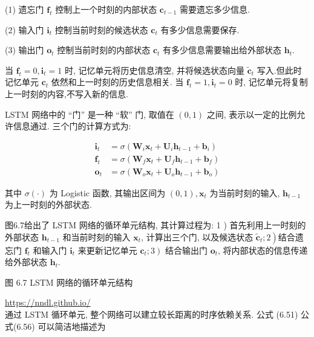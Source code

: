 \documentclass[10pt]{article}
\begin{document}
(1) 遗忘门 $\boldsymbol{f}_{t}$ 控制上一个时刻的内部状态 $\boldsymbol{c}_{t-1}$ 需要遗忘多少信息.

(2) 输入门 $\boldsymbol{i}_{t}$ 控制当前时刻的候选状态 $\boldsymbol{c}_{t}$ 有多少信息需要保存.

(3) 输出门 $\boldsymbol{o}_{t}$ 控制当前时刻的内部状态 $\boldsymbol{c}_{t}$ 有多少信息需要输出给外部状态 $\boldsymbol{h}_{t}$.

当 $\boldsymbol{f}_{t}=0, \boldsymbol{i}_{t}=1$ 时, 记忆单元将历史信息清空, 并将候选状态向量 $\tilde{\boldsymbol{c}}_{t}$ 写入.但此时记忆单元 $\boldsymbol{c}_{t}$ 依然和上一时刻的历史信息相关. 当 $\boldsymbol{f}_{t}=1, \boldsymbol{i}_{t}=0$ 时, 记忆单元将复制上一时刻的内容,不写入新的信息.

LSTM 网络中的 “门” 是一种 “软” 门, 取值在 $(0,1)$ 之间, 表示以一定的比例允许信息通过. 三个门的计算方式为:


\begin{align*}
\boldsymbol{i}_{t} & =\sigma\left(\boldsymbol{W}_{i} \boldsymbol{x}_{t}+\boldsymbol{U}_{i} \boldsymbol{h}_{t-1}+\boldsymbol{b}_{i}\right)  \tag{6.54}\\
\boldsymbol{f}_{t} & =\sigma\left(\boldsymbol{W}_{f} \boldsymbol{x}_{t}+\boldsymbol{U}_{f} \boldsymbol{h}_{t-1}+\boldsymbol{b}_{f}\right)  \tag{6.55}\\
\boldsymbol{o}_{t} & =\sigma\left(\boldsymbol{W}_{o} \boldsymbol{x}_{t}+\boldsymbol{U}_{o} \boldsymbol{h}_{t-1}+\boldsymbol{b}_{o}\right) \tag{6.56}
\end{align*}


其中 $\sigma(\cdot)$ 为 Logistic 函数, 其输出区间为 $(0,1), \boldsymbol{x}_{t}$ 为当前时刻的输入, $\boldsymbol{h}_{t-1}$ 为上一时刻的外部状态.

图6.7给出了 LSTM 网络的循环单元结构, 其计算过程为: 1 ) 首先利用上一时刻的外部状态 $\boldsymbol{h}_{t-1}$ 和当前时刻的输入 $\boldsymbol{x}_{t}$, 计算出三个门, 以及候选状态 $\left.\tilde{\boldsymbol{c}}_{t} ; 2\right)$结合遗忘门 $\boldsymbol{f}_{t}$ 和输入门 $\boldsymbol{i}_{t}$ 来更新记忆单元 $\left.\boldsymbol{c}_{t} ; 3\right)$ 结合输出门 $\boldsymbol{o}_{t}$, 将内部状态的信息传递给外部状态 $\boldsymbol{h}_{t}$.



图 6.7 LSTM 网络的循环单元结构

\href{https://nndl.github.io/}{https://nndl.github.io/}\\
通过 LSTM 循环单元, 整个网络可以建立较长距离的时序依赖关系. 公式 (6.51) 公式(6.56) 可以简洁地描述为
\end{document}
